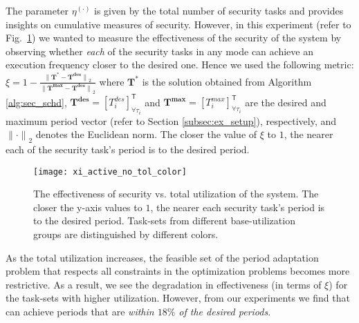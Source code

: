\documentclass[../rt_server_main.tex]{subfiles}
\begin{document}
The parameter $\eta^{(\cdot)}$ is given by the total number of security tasks and provides insights on cumulative measures of security. However, in this experiment (refer to Fig.~\ref{fig:effect_security}) we wanted to measure the effectiveness of the security of the system by observing whether \textit{each} of the security tasks in any mode can achieve an execution frequency closer to the desired one. Hence we used the following metric: 
$\xi = 1- \frac{ {\lVert \mathbf{T}^* - \mathbf{T^{des}}\rVert}_2}{{\lVert \mathbf{T^{max}} - \mathbf{T^{des}}\rVert}_2}$ where $\mathbf{T}^*$ is the solution obtained from Algorithm \ref{alg:sec_schd}, $\mathbf{T^{des}} = [T_i^{des}]_{\forall \tau_i }^{\mathsf{T}} $ and $\mathbf{T^{max}} = [T_i^{max}]_{\forall \tau_i }^{\mathsf{T}} $ are the desired and maximum period vector (refer to Section \ref{subsec:ex_setup}), respectively, and ${\lVert \cdot \rVert}_2$ denotes the Euclidean norm. The closer the value of $\xi$ to $1$, the nearer  each of the security task's  period is to the  desired period. 


 \begin{figure}[!t]
\centering
\texttt{[image: xi\_active\_no\_tol\_color]}
\caption{The effectiveness of security  vs. total utilization of the system. The closer the y-axis values to $1$, the nearer each security task's period is to the desired period. Task-sets from different base-utilization groups are distinguished by different colors. %
}
\label{fig:effect_security}
 \end{figure}



As the total utilization increases, the feasible set of the period adaptation problem that respects all constraints in  the optimization problems becomes more restrictive. As a result, we see the degradation in effectiveness (in terms of $\xi$) for the task-sets with higher utilization. However,
from our experiments we find that \coolname can achieve periods that are \textit{within $18\%$ of the desired periods}.
\end{document}
